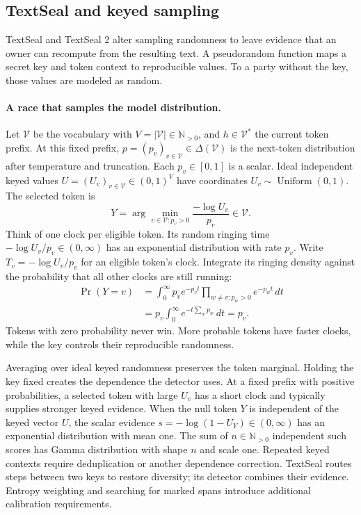 \subsection{TextSeal and keyed sampling}
\label{app:textseal}
TextSeal \citep{textseal} and TextSeal 2 \citep{textseal2} alter sampling randomness to leave evidence that an owner can recompute from the resulting text. A pseudorandom function maps a secret key and token context to reproducible values. To a party without the key, those values are modeled as random.

\paragraph{A race that samples the model distribution.}
Let $\mathcal V$ be the vocabulary with $V=|\mathcal V|\in\mathbb N_{>0}$, and $h\in\mathcal V^*$ the current token prefix. At this fixed prefix, $p=(p_v)_{v\in\mathcal V}\in\Delta(\mathcal V)$ is the next-token distribution after temperature and truncation. Each $p_v\in[0,1]$ is a scalar. Ideal independent keyed values $U=(U_v)_{v\in\mathcal V}\in(0,1)^V$ have coordinates $U_v\sim\operatorname{Uniform}(0,1)$. The selected token is
\begin{equation}
\label{eq:textseal-token-race}
 Y=\arg\min_{v\in\mathcal V:p_v>0}\frac{-\log U_v}{p_v}\in\mathcal V.
\end{equation}
Think of one clock per eligible token. Its random ringing time $-\log U_v/p_v\in(0,\infty)$ has an exponential distribution with rate $p_v$. Write $T_v=-\log U_v/p_v$ for an eligible token's clock. Integrate its ringing density against the probability that all other clocks are still running:
\begin{align}
 \Pr(Y=v)
   &=\int_0^\infty p_v e^{-p_v t}\!
             \prod_{w\ne v:p_w>0} e^{-p_w t}\,dt
     \label{eq:textseal-race-integral}\\
   &=p_v\int_0^\infty e^{-t\sum_w p_w}\,dt
     =p_v.\label{eq:textseal-race-marginal}
\end{align} Tokens with zero probability never win. More probable tokens have faster clocks, while the key controls their reproducible randomness.

Averaging over ideal keyed randomness preserves the token marginal. Holding the key fixed creates the dependence the detector uses. At a fixed prefix with positive probabilities, a selected token with large $U_v$ has a short clock and typically supplies stronger keyed evidence. When the null token $Y$ is independent of the keyed vector $U$, the scalar evidence $s=-\log(1-U_Y)\in(0,\infty)$ has an exponential distribution with mean one. The sum of $n\in\mathbb N_{>0}$ independent such scores has Gamma distribution with shape $n$ and scale one. Repeated keyed contexts require deduplication or another dependence correction. TextSeal routes steps between two keys to restore diversity; its detector combines their evidence. Entropy weighting and searching for marked spans introduce additional calibration requirements.

